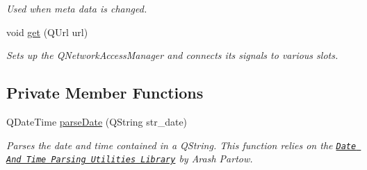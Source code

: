\begin{DoxyCompactItemize}
\begin{DoxyCompactList}\small\item\em Used when meta data is changed. \end{DoxyCompactList}\item 
void \hyperlink{class_rss_client_a4133d7464dc3ed28bca7b0537d890e58}{get} (Q\+Url url)
\begin{DoxyCompactList}\small\item\em Sets up the Q\+Network\+Access\+Manager and connects its signals to various slots. \end{DoxyCompactList}\end{DoxyCompactItemize}
\subsection*{Private Member Functions}
\begin{DoxyCompactItemize}
\item 
Q\+Date\+Time \hyperlink{class_rss_client_ad9154be13d0578b3863ad12b1472e72e}{parse\+Date} (Q\+String str\+\_\+date)
\begin{DoxyCompactList}\small\item\em Parses the date and time contained in a Q\+String. This function relies on the \href{http://www.partow.net/programming/datetime/index.html}{\tt Date And Time Parsing Utilities Library} by Arash Partow. \end{DoxyCompactList}\end{DoxyCompactItemize}
